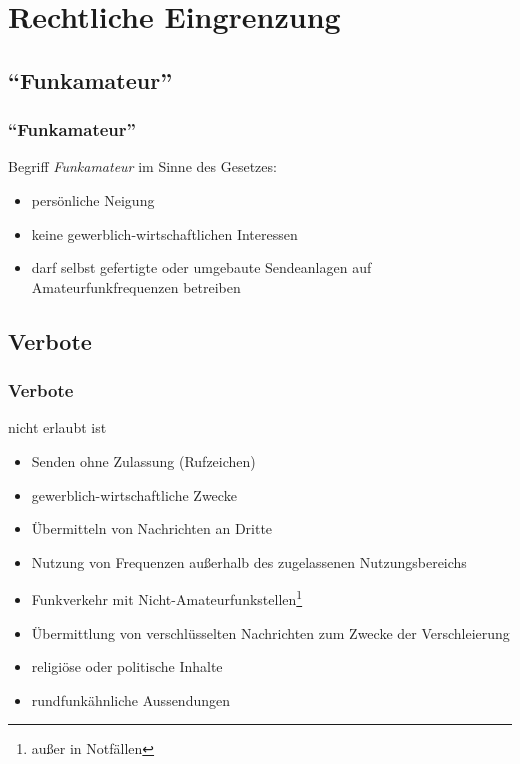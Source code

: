 \section{Rechtliche Eingrenzung}

\subsection{``Funkamateur''}

\begin{frame}
    \frametitle{``Funkamateur''}

    Begriff \emph{Funkamateur} im Sinne des Gesetzes:

    \begin{itemize}
        \item persönliche Neigung
        \item keine gewerblich-wirtschaftlichen Interessen
        \item darf selbst gefertigte oder umgebaute Sendeanlagen auf Amateurfunkfrequenzen betreiben
    \end{itemize}

\end{frame}

\subsection{Verbote}

\begin{frame}
    \frametitle{Verbote}

    nicht erlaubt ist

    \begin{itemize}
        \item Senden ohne Zulassung (Rufzeichen)
        \item gewerblich-wirtschaftliche Zwecke
        \item Übermitteln von Nachrichten an Dritte
        \item Nutzung von Frequenzen außerhalb des zugelassenen Nutzungsbereichs
        \item Funkverkehr mit Nicht-Amateurfunkstellen\footnote{außer in Notfällen}
        \item Übermittlung von verschlüsselten Nachrichten zum Zwecke der Verschleierung
        \item religiöse oder politische Inhalte
        \item rundfunkähnliche Aussendungen
    \end{itemize}

\end{frame}

